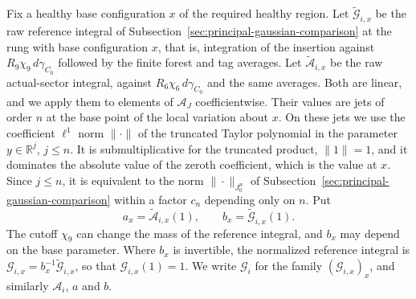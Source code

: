 Fix a healthy base configuration $x$ of the required healthy region. Let
$\widetilde{\mathcal G}_{i,x}$ be the raw reference integral of
Subsection~\ref{sec:principal-gaussian-comparison} at the rung with base
configuration $x$, that is, integration of the insertion against
$R_9\chi_9\,d\gamma_{C_0}$ followed by the finite forest and tag
averages. Let $\widetilde{\mathcal A}_{i,x}$ be the raw actual-sector
integral, against $R_6\chi_6\,d\gamma_{C_0}$ and the same averages. Both
are linear, and we apply them to elements of $\mathscr A_J$
coefficientwise. Their values are jets of order $n$ at the base point of
the local variation about $x$. On these jets we use the coefficient
$\ell^1$ norm $\|\cdot\|$ of the truncated Taylor polynomial in the
parameter $y\in\mathbb R^j$, $j\le n$. It is submultiplicative for the
truncated product, $\|1\|=1$, and it dominates the absolute value of the
zeroth coefficient, which is the value at $x$. Since $j\le n$, it is
equivalent to the norm $\|\cdot\|_{J^n_0}$ of
Subsection~\ref{sec:principal-gaussian-comparison} within a factor $c_n$
depending only on $n$. Put
\[
 a_x=\widetilde{\mathcal A}_{i,x}(1),\qquad
 b_x=\widetilde{\mathcal G}_{i,x}(1).
\]
The cutoff $\chi_9$ can change the mass of the reference integral, and
$b_x$ may depend on the base parameter. Where $b_x$ is invertible, the
normalized reference integral is
$\mathcal G_{i,x}=b_x^{-1}\widetilde{\mathcal G}_{i,x}$, so that
$\mathcal G_{i,x}(1)=1$. We write $\mathcal G_i$ for the family
$(\mathcal G_{i,x})_x$, and similarly $\mathcal A_i$, $a$ and $b$.

